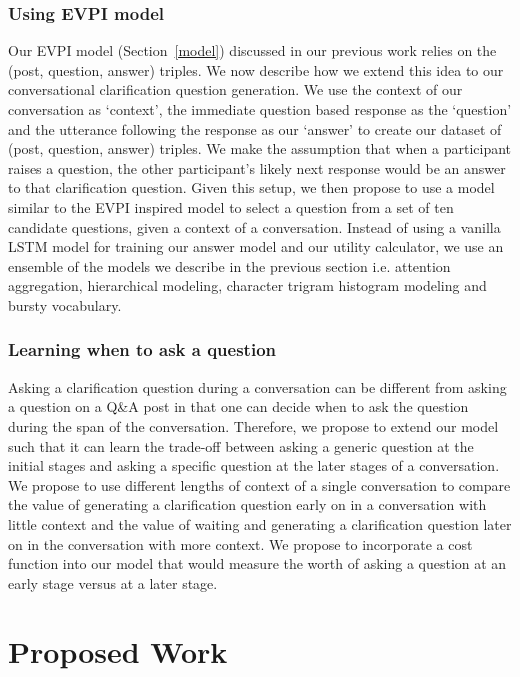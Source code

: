 \documentclass[11pt]{report}
\begin{document}
\subsection{Using EVPI model}
Our EVPI model (Section~\ref{model}) discussed in our previous work relies on the (post, question, answer) triples. We now describe how we extend this idea to our conversational clarification question generation. We use the context of our conversation as `context', the immediate question based response as the `question' and the utterance following the response as our `answer' to create our dataset of (post, question, answer) triples. We make the assumption that when a participant raises a question, the other participant's likely next response would be an answer to that clarification question.  Given this setup, we then propose to use a model similar to the EVPI inspired model to select a question from a set of ten candidate questions, given a context of a conversation. Instead of using a vanilla LSTM model for training our answer model and our utility calculator, we use an ensemble of the models we describe in the previous section i.e. attention aggregation, hierarchical modeling, character trigram histogram modeling and bursty vocabulary. 

\subsection{Learning when to ask a question}
Asking a clarification question during a conversation can be different from asking a question on a Q\&A post in that one can decide when to ask the question during the span of the conversation. Therefore, we propose to extend our model such that it can learn the trade-off between asking a generic question at the initial stages and asking a specific question at the later stages of a conversation. We propose to use different lengths of context of a single conversation to compare the value of generating a clarification question early on in a conversation with little context and the value of waiting and generating a clarification question later on in the conversation with more context. We propose to incorporate a cost function into our model that would measure the worth of asking a question at an early stage versus at a later stage.

\newpage

\chapter{Proposed Work}\label{proposed_work}
\end{document}
